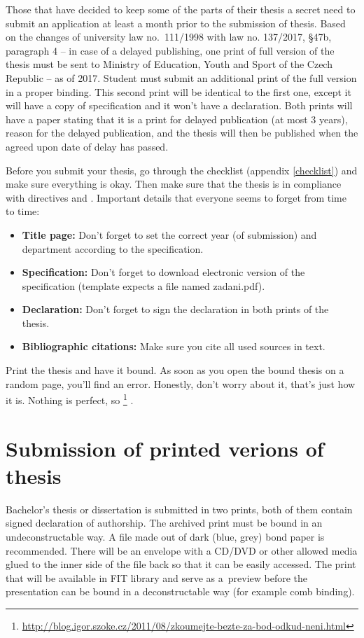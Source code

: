 {{Those that have decided to keep some of the parts of their thesis a secret need to submit an application at least a month prior to the submission of thesis. Based on the changes of university law no.~111/1998 with law no. 137/2017, \S 47b, paragraph 4 -- in case of a delayed publishing, one print of full version of the thesis must be sent to Ministry of Education, Youth and Sport of the Czech Republic -- as of 2017. Student must submit an additional print of the full version in a proper binding. This second print will be identical to the first one, except it will have a copy of specification and it won't have a declaration. Both prints will have a paper stating that it is a print for delayed publication (at most 3 years), reason for the delayed publication, and the thesis will then be published when the agreed upon date of delay has passed.

Before you submit your thesis, go through the checklist (appendix \ref{checklist}) and make sure everything is okay. Then make sure that the thesis is in compliance with directives \cite{smernice} and \cite{smerniceFIT}. Important details that everyone seems to forget from time to time:
\begin{itemize}
	\item \textbf{Title page:}  Don't forget to set the correct year (of submission) and department according to the specification.
	\item \textbf{Specification:} Don't forget to download electronic version of the specification (template expects a file named zadani.pdf).
    \item \textbf{Declaration:} Don't forget to sign the declaration in both prints of the thesis.
    \item \textbf{Bibliographic citations:} Make sure you cite all used sources in text.
\end{itemize}

Print the thesis and have it bound. As soon as you open the bound thesis on a random page, you'll find an error. Honestly, don't worry about it, that's just how it is. Nothing is perfect, so \footnote{\url{http://blog.igor.szoke.cz/2011/08/zkoumejte-bezte-za-bod-odkud-neni.html}} \cite{rady}.

\section{Submission of printed verions of thesis}
Bachelor's thesis or dissertation is submitted in two prints, both of them contain signed declaration of authorship. The archived print must be bound in an undeconstructable way. A file made out of dark (blue, grey) bond paper is recommended. There will be an envelope with a CD/DVD or other allowed media glued to the inner side of the file back so that it can be easily accessed. The print that will be available in FIT library and serve as a~preview before the presentation can be bound in a deconstructable way (for example comb binding).

}}
